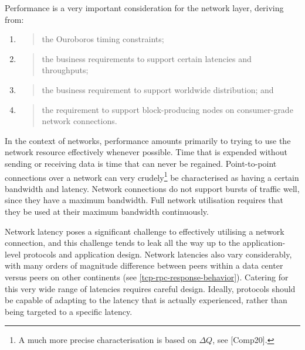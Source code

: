 \documentclass[11pt,a4paper]{article}
\begin{document}
Performance is a very important consideration for the network layer,
deriving from:

\begin{enumerate}
\def\labelenumi{\arabic{enumi}.}
\item
  \begin{quote}
  the Ouroboros timing constraints;
  \end{quote}
\item
  \begin{quote}
  the business requirements to support certain latencies and
  throughputs;
  \end{quote}
\item
  \begin{quote}
  the business requirement to support worldwide distribution; and
  \end{quote}
\item
  \begin{quote}
  the requirement to support block-producing nodes on consumer-grade
  network connections.
  \end{quote}
\end{enumerate}

In the context of networks, performance amounts primarily to trying to
use the network resource effectively whenever possible. Time that is
expended without sending or receiving data is time that can never be
regained. Point-to-point connections over a network can very
crudely\footnote{A much more precise characterisation is based on $\Delta{}Q$,
  see {[}Comp20{]}.} be characterised as having a certain bandwidth and
latency. Network connections do not support bursts of traffic well,
since they have a maximum bandwidth. Full network utilisation requires
that they be used at their maximum bandwidth continuously.

Network latency poses a significant challenge to effectively utilising a
network connection, and this challenge tends to leak all the way up to
the application-level protocols and application design. Network
latencies also vary considerably, with many orders of magnitude
difference between peers within a data center versus peers on other
continents (see \cref{tcp-rpc-response-behavior}). Catering for this very wide range of latencies requires
careful design. Ideally, protocols should be capable of adapting to the
latency that is actually experienced, rather than being targeted to a
specific latency.
\end{document}
